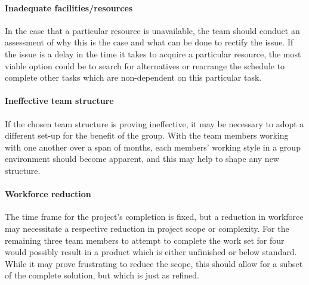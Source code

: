 \paragraph{Inadequate facilities/resources}
In the case that a particular resource is unavailable, the team should conduct
an assessment of why this is the case and what can be done to rectify the issue.
If the issue is a delay in the time it takes to acquire a particular resource,
the most viable option could be to search for alternatives or rearrange the
schedule to complete other tasks which are non-dependent on this particular
task.

\paragraph{Ineffective team structure}
If the chosen team structure is proving ineffective, it may be necessary to
adopt a different set-up for the benefit of the group. With the team members
working with one another over a span of months, each members' working style in a
group environment should become apparent, and this may help to shape any new
structure.

\paragraph{Workforce reduction}
The time frame for the project's completion is fixed, but a reduction in
workforce may necessitate a respective reduction in project scope or complexity.
For the remaining three team members to attempt to complete the work set for
four would possibly result in a product which is either unfinished or below
standard. While it may prove frustrating to reduce the scope, this should allow
for a subset of the complete solution, but which is just as refined.
